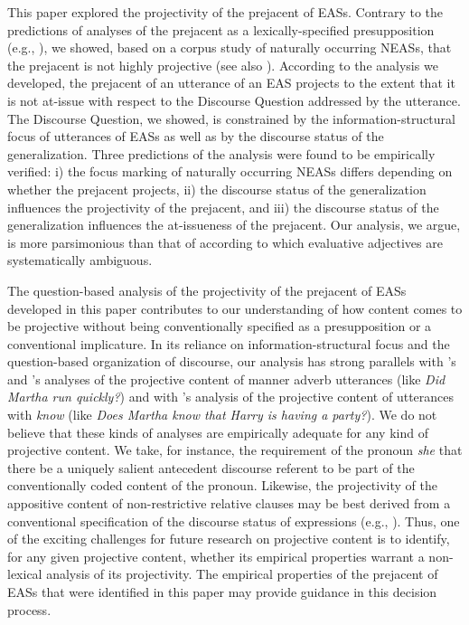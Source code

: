\documentclass[11pt,fleqn]{article}
\newcommand{\6}{\mbox{$[\hspace*{-.6mm}[$}}
\newcommand{\9}{\mbox{$]\hspace*{-.6mm}]$}}
\newcommand{\citepos}[1]{\citeauthor{#1}'s \citeyear{#1}}
\begin{document}
This paper explored the projectivity of the prejacent of EASs. Contrary to the predictions of analyses of the prejacent as a lexically-specified presupposition (e.g., \citealt{barker02,oshima09b}), we showed, based on a corpus study of naturally occurring NEASs, that the prejacent is not highly projective (see also \citealt{tbd-variability}). According to the analysis we developed, the prejacent of an utterance of an EAS projects to the extent that it is not at-issue with respect to the Discourse Question addressed by the utterance. The Discourse Question, we showed, is constrained by the information-structural focus of utterances of EASs as well as by the discourse status of the generalization. Three predictions of the analysis were found to be empirically verified: i) the focus marking of naturally occurring NEASs differs depending on whether the prejacent projects, ii) the discourse status of the generalization influences the projectivity of the prejacent, and iii) the discourse status of the generalization influences the at-issueness of the prejacent. Our analysis, we argue, is more parsimonious than that of \citealt{karttunen-etal2014} according to which evaluative adjectives are systematically ambiguous.

The question-based analysis of the projectivity of the prejacent of EASs developed in this paper contributes to our understanding of how content comes to be projective without being conventionally specified as a presupposition or a conventional implicature. In its reliance on information-structural focus and the question-based organization of discourse, our analysis has strong parallels with \citepos{abrusan2013} and \citepos{stevens-etal2017} analyses of the projective content of manner adverb utterances (like {\em Did Martha run quickly?}) and with \citepos{best-question} analysis of the projective content of utterances with {\em know} (like {\em Does Martha know that Harry is having a party?}). We do not believe that these kinds of analyses are empirically adequate for any kind of projective content. We take, for instance, the requirement of the pronoun {\em she} that there be a uniquely salient antecedent discourse referent to be part of the conventionally coded content of the pronoun. Likewise, the projectivity of the appositive content of non-restrictive relative clauses may be best derived from a conventional specification of the discourse status of expressions (e.g., \citealt{potts05,murray2014}). Thus, one of the exciting challenges for future research on projective content is to identify, for any given projective content, whether its empirical properties warrant a non-lexical analysis of its projectivity. The empirical properties of the prejacent of EASs that were identified in this paper may provide guidance in this decision process.
\end{document}
